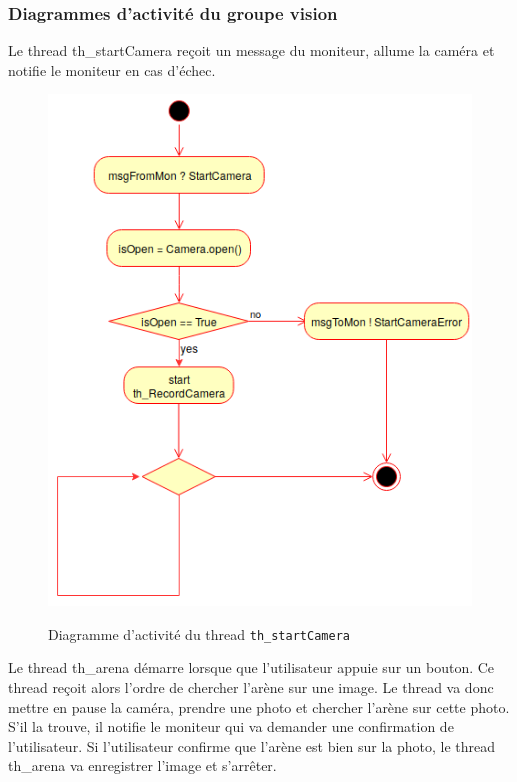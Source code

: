 \documentclass[11pt, a4paper]{paper}
\begin{document}
\subsubsection{Diagrammes d'activité du groupe vision}
{Le thread th\_startCamera reçoit un message du moniteur, allume la caméra et notifie le moniteur en cas d'échec.}

\begin{figure}[htbp]
\label{fig:act_envoyer}
\begin{center}
{\includegraphics[scale=.3]{./dossier_conception/th_startCamera}}
{\caption{Diagramme d'activité du thread {\tt th\_startCamera}}}
\end{center}
\end{figure}
\FloatBarrier

{Le thread th\_arena démarre lorsque que l'utilisateur appuie sur un bouton. Ce thread reçoit alors l'ordre de chercher l'arène sur une image. Le thread va donc mettre en pause la caméra, prendre une photo et chercher l'arène sur cette photo. S'il la trouve, il notifie le moniteur qui va demander une confirmation de l'utilisateur. Si l'utilisateur confirme que l'arène est bien sur la photo, le thread th\_arena va enregistrer l'image et s'arrêter. }
\end{document}
